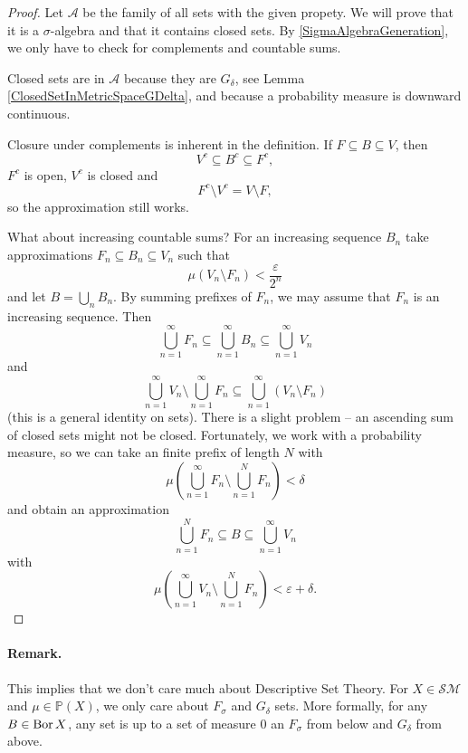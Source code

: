 \begin{proof}
    Let \( \mathcal{A} \) be the family of all sets with the given propety. We will prove that it is a \( \sigma \)-algebra and that it contains closed sets. By \ref{SigmaAlgebraGeneration}, we only have to check for complements and countable sums.

    Closed sets are in \( \mathcal{A} \) because they are \( G_\delta \), see Lemma \ref{ClosedSetInMetricSpaceGDelta}, and because a probability measure is downward continuous.

    Closure under complements is inherent in the definition. If \( F \subseteq B \subseteq V \), then 
    \[ 
      V^c \subseteq B^c \subseteq F^c,
   \]
   \( F^c \) is open, \( V^c \) is closed and
   \[ 
      F^c \setminus V^c = V \setminus F, 
  \]
  so the approximation still works.

What about increasing countable sums? For an increasing sequence \( B_n \) take approximations \( F_n \subseteq B_n \subseteq V_n \) such that
\[ 
    \mu \left( V_n \setminus F_n \right) < \frac{\varepsilon }{2^n}
\]
and let \( B = \bigcup_n B_n \). By summing prefixes of \( F_n \), we may assume that \( F_n \) is an increasing sequence. Then
\[ 
    \bigcup_{n=1}^\infty F_n \subseteq \bigcup_{n=1}^\infty B_n \subseteq \bigcup_{n=1}^\infty V_n
\]
and
\[ 
    \bigcup_{n=1}^\infty V_n \setminus \bigcup_{n=1}^\infty F_n \subseteq \bigcup_{n=1}^\infty (V_n \setminus F_n) 
\]
(this is a general identity on sets). There is a slight problem -- an ascending sum of closed sets might not be closed. Fortunately, we work with a probability measure, so we can take an finite prefix of length \( N \) with
\[ 
    \mu \left( \bigcup_{n=1}^\infty F_n \setminus \bigcup_{n=1}^N F_n \right) < \delta
\]
and obtain an approximation
\[ 
    \bigcup_{n=1}^N F_n \subseteq B \subseteq \bigcup_{n=1}^\infty V_n 
\]
with
\[ 
    \mu \left( \bigcup_{n=1}^\infty V_n \setminus \bigcup_{n=1}^N F_n \right) <\varepsilon + \delta. 
\]
\end{proof}


\paragraph{Remark.} This implies that we don't care much about Descriptive Set Theory. For \( X \in \mathcal{SM} \) and \( \mu \in \mathbb{P}(X) \), we only care about \( F_\sigma \) and \( G_\delta \) sets. More formally, for any \( B \in \operatorname{Bor} X \), any set is up to a set of measure \( 0 \) an \( F_\sigma \) from below and \( G_\delta \) from above.

